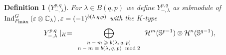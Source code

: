 \documentclass[12pt]{article} %
\theoremstyle{plain}
\newtheorem{definition}{Definition}
\theoremstyle{remark}
\newcommand{\longhookrightarrow}{{\lhook\joinrel\relbar\joinrel\rightarrow}}
\newcommand{\tmscript}[1]{ {\scriptsize #1} }
\newcommand{\assign}{:=}
\newcommand{\myInd}[1]{\mbox{Ind}_{P_{\mbox{\scriptsize\normalfont max}}}^G\left( \varepsilon\otimes \C_{#1} \right)}
\begin{document}
\begin{definition}[$Y_{-,\lambda}^{p,q}$]
	For $\lambda\in B(q,p)$	we
	 define $Y_{-,\lambda}^{p,q}$ as submodule of $\myInd{\lambda},\varepsilon=(-1)^{b(\lambda,q,p)}$ with the $K$-type
	\begin{equation*}
		\begin{array}[]{c}
   Y_{-, \lambda}^{p, q} \mid_K = \displaystyle\bigoplus_{\tmscript{\begin{array}{c}
    n-m \geqslant b (\lambda, q,p)\\
    n-m \equiv b (\lambda, q, p) \mbox{\normalfont\; mod\;} 2
  \end{array}}} \mathcal{H}^m (\mathbb{S}^{p - 1}) \otimes \mathcal{H}^n
  (\mathbb{S}^{q - 1}),\\
		\end{array}
	\end{equation*}
\end{definition}
\end{document}
